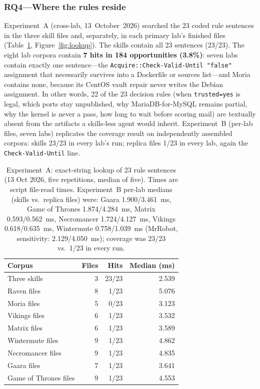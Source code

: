 \documentclass[3p,twocolumn,authoryear]{elsarticle}
\begin{document}
\subsubsection{RQ4---Where the rules reside}
\label{sec:rq4}

Experiment~A (cross-lab, 13~October~2026) searched the 23 coded rule
sentences in the three skill files and, separately, in each primary
lab's finished files (Table~\ref{tab:lookup},
Figure~\ref{fig:lookup}). The skills contain all 23 sentences
(23/23). The eight lab corpora contain \textbf{7 hits in 184
opportunities (3.8\%)}: seven labs contain exactly one sentence---the
\texttt{Acquire::Check-Valid-Until "false"} assignment that necessarily
survives into a Dockerfile or sources list---and Moria contains none,
because its CentOS vault repair never writes the Debian assignment.
In other words, 22 of the 23 decision rules (when \texttt{trusted=yes}
is legal, which ports stay unpublished, why MariaDB-for-MySQL remains
partial, why the kernel is never a pass, how long to wait before
scoring mail) are textually absent from the artifacts a skills-less
agent would inherit. Experiment~B (per-lab files, seven labs) replicates
the coverage result on independently assembled corpora: skills 23/23 in
every lab's run; replica files 1/23 in every lab, again the
\texttt{Check-Valid-Until} line.

\begin{table}[tbp]
\caption{Experiment~A: exact-string lookup of 23 rule sentences
(13 Oct 2026, five repetitions, median of five). Times are script
file-read times. Experiment~B per-lab medians (skills vs.\ replica
files) were: Gaara 1.900/3.461~ms, Game of Thrones 1.874/4.284~ms,
Matrix 0.593/0.562~ms, Necromancer 1.724/4.127~ms, Vikings
0.618/0.635~ms, Wintermute 0.758/1.039~ms (MrRobot, sensitivity:
2.129/4.050~ms); coverage was 23/23 vs.\ 1/23 in every run.}
\label{tab:lookup}
\centering\footnotesize
\begin{tabularx}{\columnwidth}{Xrrr}
\toprule
Corpus & Files & Hits & Median (ms)\\
\midrule
Three skills & 3 & 23/23 & 2.539\\
Raven files & 8 & 1/23 & 5.076\\
Moria files & 5 & 0/23 & 3.123\\
Vikings files & 6 & 1/23 & 3.532\\
Matrix files & 6 & 1/23 & 3.589\\
Wintermute files & 9 & 1/23 & 4.862\\
Necromancer files & 9 & 1/23 & 4.835\\
Gaara files & 7 & 1/23 & 3.641\\
Game of Thrones files & 9 & 1/23 & 4.553\\
\bottomrule
\end{tabularx}
\end{table}
\end{document}

